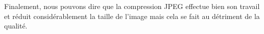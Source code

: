 \documentclass[12pt]{report}
\begin{document}
Finalement, nous pouvons dire que la compression JPEG effectue bien son travail et réduit considérablement la taille de l'image mais cela se fait au détriment de la qualité. 

\newpage



\renewcommand*\listfigurename{\large Liste des figures}
\listoffigures
\newpage
\end{document}
